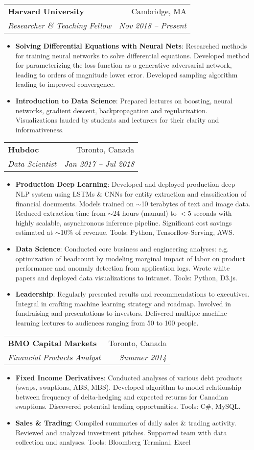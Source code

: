 \documentclass[letterpaper,11pt]{article}
\makeatletter
\newcommand{\resumeItem}[2]{
  \item\small{
    \textbf{#1}{: #2 \vspace{-2pt}}
  }
}
\newcommand{\resumeSubheading}[4]{
  \vspace{-1pt}\item
    \begin{tabular*}{0.97\textwidth}[t]{l@{\extracolsep{\fill}}r}
      \textbf{#1} & #2 \\
      \textit{\small#3} & \textit{\small #4} \\
    \end{tabular*}\vspace{-5pt}
}
\newcommand{\resumeItemListStart}{\begin{itemize}}
\newcommand{\resumeItemListEnd}{\end{itemize}\vspace{-5pt}}
\makeatother
\begin{document}
  \resumeSubheading
    {Harvard University}{Cambridge, MA}
    {Researcher \& Teaching Fellow}{Nov 2018 -- Present}
    \resumeItemListStart
      \resumeItem{Solving Differential Equations with Neural Nets}
        {
        Researched methods for training neural networks to solve differential equations.
        Developed method for parameterizing the loss function as a generative adversarial network,
        leading to orders of magnitude lower error.
        Developed sampling algorithm leading to improved convergence.
        }
      \resumeItem{Introduction to Data Science}
        {
        Prepared lectures on boosting, neural networks, gradient descent, backpropagation and regularization.
        Visualizations lauded by students and lecturers for their clarity and informativeness.
        }
    \resumeItemListEnd

    \resumeSubheading
      {Hubdoc}{Toronto, Canada}
      {Data Scientist}{Jan 2017 -- Jul 2018}
      \resumeItemListStart
        \resumeItem{Production Deep Learning}
          {
          Developed and deployed production deep NLP system using LSTMs \& CNNs for entity extraction and
          classification of financial documents.
          Models trained on $\sim$10 terabytes of text and image data.
          Reduced extraction time from $\sim$24 hours (manual) to $<5$ seconds with highly scalable,
          asynchronous inference pipeline. Significant cost savings estimated at $\sim$10\% of revenue.
          Tools: Python, Tensorflow-Serving, AWS.
          }
        \resumeItem{Data Science}
          {
          Conducted core business and engineering analyses: e.g. optimization of headcount by modeling marginal impact of labor
          on product performance and anomaly detection from application logs.
          Wrote white papers and deployed data visualizations to intranet.
          Tools: Python, D3.js.
          }
        \resumeItem{Leadership}
          {
          Regularly presented results and recommendations to executives.
          Integral in crafting machine learning strategy and roadmap.
          Involved in fundraising and presentations to investors.
          Delivered multiple machine learning lectures to audiences ranging from 50 to 100 people.
          }
      \resumeItemListEnd

    \resumeSubheading
      {BMO Capital Markets}{Toronto, Canada}
      {Financial Products Analyst}{Summer 2014}
      \resumeItemListStart
        \resumeItem{Fixed Income Derivatives}
          {
          Conducted analyses of various debt products (swaps, swaptions, ABS, MBS).
          Developed algorithm to model relationship between frequency of delta-hedging and expected returns for Canadian swaptions.
          Discovered potential trading opportunities.
          Tools: C\#, MySQL.
          }
        \resumeItem{Sales \& Trading}
          {
          Compiled summaries of daily sales \& trading activity.
          Reviewed and analyzed investment pitches.
          Supported team with data collection and analyses.
          Tools: Bloomberg Terminal, Excel
          }
      \resumeItemListEnd
\end{document}
